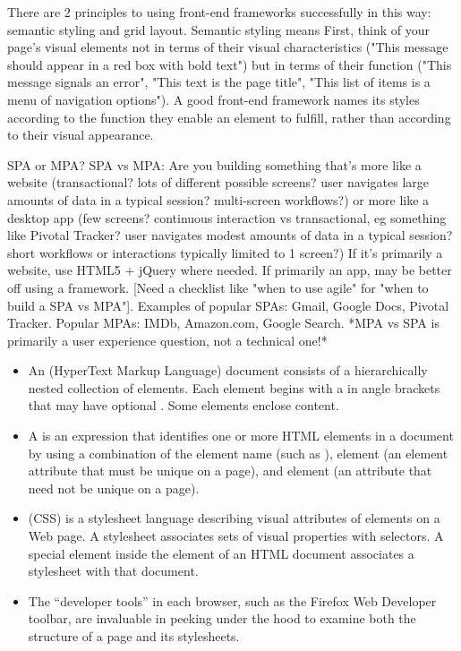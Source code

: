 \begin{NEW}
There are 2 principles to using front-end frameworks successfully in
this way: semantic styling and grid layout. Semantic styling means
First, think of your page's visual elements not in terms of their
visual characteristics ("This message should appear in a red box with
bold text") but in terms of their function ("This message signals an
error", "This text is the page title", "This list of items is a menu
of navigation options"). A good front-end framework names its styles
according to the function they enable an element to fulfill, rather
than according to their visual appearance.


\end{NEW}

\begin{elaboration}{SPA or MPA?}
SPA vs MPA: Are you building something that's more like a website
(transactional? lots of different possible screens? user navigates
large amounts of data in a typical session? multi-screen workflows?)
or more like a desktop app (few screens? continuous interaction vs
transactional, eg something like Pivotal Tracker? user navigates
modest amounts of data in a typical session? short workflows or
interactions typically limited to 1 screen?)  If it's primarily a
website, use HTML5 + jQuery where needed. If primarily an app, may be
better off using a framework. [Need a checklist like "when to use
  agile" for "when to build a SPA vs MPA"].  Examples of popular SPAs:
Gmail, Google Docs, Pivotal Tracker.  Popular MPAs: IMDb, Amazon.com,
Google Search.  *MPA vs SPA is primarily a user experience question,
not a technical one!*

\end{elaboration}


\begin{summary}
  \begin{itemize}
  \item An  (HyperText Markup Language) document consists
    of a hierarchically nested collection
    of elements. Each
    element begins with a   in \tl{}angle
    brackets\tg{} that may have optional
    .  Some elements enclose content.
  \item A  is an expression that identifies
    one or more HTML elements in a document by using a combination of
    the element name (such as ), element 
        (an element attribute that must be unique on a page), and
    element  (an attribute that need not be unique on a page).
  \item {} (CSS) is a stylesheet language describing
    visual attributes of elements on a Web page.  A stylesheet associates
    sets of visual properties with  selectors.  A
    special  element inside the  element of an HTML
    document associates a stylesheet with that document.
  \item The ``developer tools'' in each browser, such as the Firefox Web
    Developer toolbar, are invaluable in peeking under
    the hood to examine both the structure of a page and its stylesheets.
  \end{itemize}
\end{summary}

